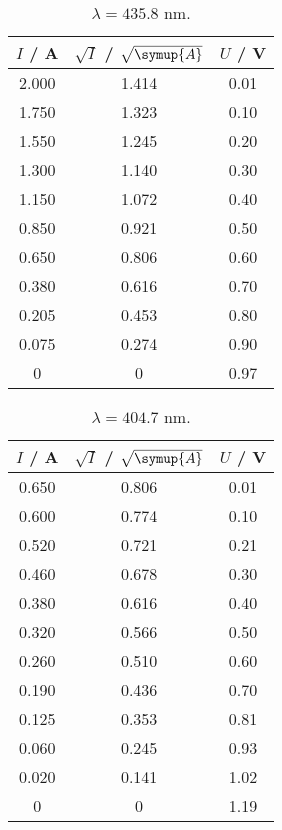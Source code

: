 \begin{table}
\centering
 \caption{$\lambda = 435.8 $ nm.} 
        \begin{tabular}{c c c}
            \toprule
            { $I$ / A} & {$\sqrt{I}$ / $\sqrt{\symup{A}}$} & {$U$ / V} \\
            \midrule
               2.000 & 1.414 & 0.01 \\
               1.750 & 1.323 & 0.10 \\
               1.550 & 1.245 & 0.20 \\
               1.300 & 1.140 & 0.30 \\
               1.150 & 1.072 & 0.40 \\
               0.850 & 0.921 & 0.50 \\
               0.650 & 0.806 & 0.60 \\
               0.380 & 0.616 & 0.70 \\
               0.205 & 0.453 & 0.80 \\
               0.075 & 0.274 & 0.90 \\
               0     & 0& 0.97 \\
         \bottomrule
        \end{tabular}
       
        \end{table}
\begin{table}
\centering
    \caption{$\lambda = 404.7 $ nm.} 
    \label{tab:tabelle6}
        \begin{tabular}{c c c}
        
            \toprule
            { $I$ / A} & {$\sqrt{I}$ / $\sqrt{\symup{A}}$} & {$U$ / V} \\
            \midrule
            0.650 & 0.806 & 0.01 \\
            0.600 & 0.774 & 0.10 \\
            0.520 & 0.721 & 0.21 \\
            0.460 & 0.678 & 0.30 \\
            0.380 & 0.616 & 0.40 \\
            0.320 & 0.566 & 0.50 \\
            0.260 & 0.510 & 0.60 \\
            0.190 & 0.436 & 0.70 \\
            0.125 & 0.353 & 0.81 \\
            0.060 & 0.245 & 0.93 \\
            0.020 & 0.141 & 1.02 \\
            0     & 0 & 1.19 \\
         \bottomrule
        \end{tabular}
        
        \end{table}
